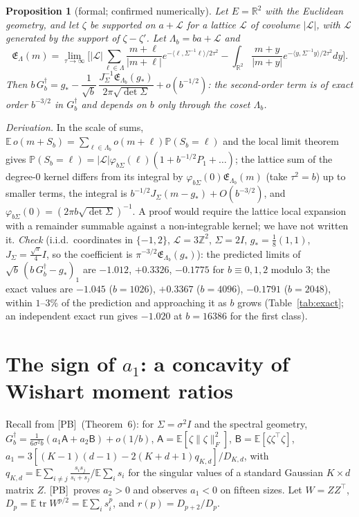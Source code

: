 \documentclass[10pt]{article}
\newtheorem{proposition}[theorem]{Proposition}
\theoremstyle{definition}
\theoremstyle{remark}
\newcommand{\R}{\mathbb{R}}
\newcommand{\Z}{\mathbb{Z}}
\newcommand{\E}{\mathbb{E}}
\newcommand{\Prob}{\mathbb{P}}
\newcommand{\nF}[1]{\|#1\|_{F}}
\newcommand{\inner}[2]{\langle #1, #2\rangle}
\newcommand{\tr}{\operatorname{tr}}
\newcommand{\cA}{\mathsf{A}}
\newcommand{\cB}{\mathsf{B}}
\newcommand{\st}{\dagger}
\newcommand{\PB}{\textup{[PB]}}
\begin{document}
\begin{proposition}[formal; confirmed numerically]\label{prop:lattice2}
Let $E=\R^2$ with the Euclidean geometry, and let $\zeta$ be supported on $a+\mathcal L$ for a lattice $\mathcal L$ of
covolume $|\mathcal L|$, with $\mathcal L$ generated by the support of $\zeta-\zeta'$. Let $\Lambda_b=ba+\mathcal L$ and
\[
\mathfrak E_\Lambda(m)=\lim_{\tau\to\infty}\Big[|\mathcal L|\sum_{\ell\in\Lambda}\frac{m+\ell}{|m+\ell|}e^{-\inner\ell{\Sigma^{-1}\ell}/2\tau^2}
-\int_{\R^2}\frac{m+y}{|m+y|}e^{-\inner y{\Sigma^{-1}y}/2\tau^2}dy\Big].
\]
Then $b\,G_b^\st=g_\ast-\dfrac{1}{\sqrt b}\,\dfrac{J_\Sigma^{-1}\mathfrak E_{\Lambda_b}(g_\ast)}{2\pi\sqrt{\det\Sigma}}+o(b^{-1/2})$:
the second-order term is of exact order $b^{-3/2}$ in $G^\st_b$ and depends on $b$ only through the coset $\Lambda_b$.
\end{proposition}
\noindent\emph{Derivation.} In the scale of sums, $\E\,o(m+S_b)=\sum_{\ell\in\Lambda_b}o(m+\ell)\Prob(S_b=\ell)$ and the local
limit theorem gives $\Prob(S_b=\ell)=|\mathcal L|\varphi_{b\Sigma}(\ell)(1+b^{-1/2}P_1+\dots)$; the lattice sum of the
degree-$0$ kernel differs from its integral by $\varphi_{b\Sigma}(0)\mathfrak E_{\Lambda_b}(m)$ (take $\tau^2=b$) up to smaller
terms, the integral is $b^{-1/2}J_\Sigma(m-g_\ast)+O(b^{-3/2})$, and $\varphi_{b\Sigma}(0)=(2\pi b\sqrt{\det\Sigma})^{-1}$.
A proof would require the lattice local expansion with a remainder summable against a non-integrable kernel; we have
not written it. \emph{Check} (i.i.d.\ coordinates in $\{-1,2\}$, $\mathcal L=3\Z^2$, $\Sigma=2I$, $g_\ast=\frac18(1,1)$,
$J_\Sigma=\frac{\sqrt\pi}4I$, so the coefficient is $\pi^{-3/2}\mathfrak E_{\Lambda_b}(g_\ast)$): the predicted limits of $\sqrt b\,(b\,G^\st_b-g_\ast)_1$ are $-1.012$, $+0.3326$,
$-0.1775$ for $b\equiv0,1,2$ modulo $3$; the exact values are $-1.045$ ($b=1026$), $+0.3367$ ($b=4096$), $-0.1791$
($b=2048$), within $1$--$3\%$ of the prediction and approaching it as $b$ grows (Table~\ref{tab:exact}; an independent exact run gives $-1.020$ at $b=16386$ for the first class).

\section{The sign of $a_1$: a concavity of Wishart moment ratios}\label{sec:a1}

Recall from \PB\ (Theorem~6): for $\Sigma=\sigma^2I$ and the spectral geometry,
$G^\st_b=\frac{1}{6\sigma^2b}(a_1\cA+a_2\cB)+o(1/b)$, $\cA=\E[\zeta\nF\zeta^2]$, $\cB=\E[\zeta\zeta^\top\zeta]$,
$a_1=3[(K-1)(d-1)-2(K+d+1)q_{K,d}]/D_{K,d}$, with $q_{K,d}=\E\sum_{i\ne j}\frac{s_is_j}{s_i+s_j}/\E\sum_is_i$ for the
singular values of a standard Gaussian $K\times d$ matrix $Z$. \PB\ proves $a_2>0$ and observes $a_1<0$ on fifteen
sizes. Let $W=ZZ^\top$, $D_p=\E\tr W^{p/2}=\E\sum_is_i^p$, and $r(p)=D_{p+2}/D_p$.
\end{document}
